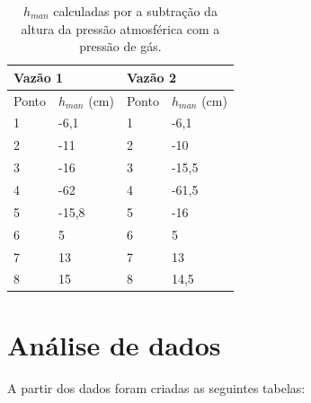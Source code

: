 \documentclass[12pt, a4]{article}
\begin{document}
\begin{table}[H]
    \centering
    \begin{tabular}{|ll|ll|}
    \hline
        \multicolumn{2}{|l|}{Vazão 1}            & \multicolumn{2}{l|}{Vazão 2}            \\ \hline
        \multicolumn{1}{|l|}{Ponto} & $h_{man}$ (cm) & \multicolumn{1}{l|}{Ponto} & $h_{man}$ (cm) \\ \hline
        \multicolumn{1}{|l|}{1}     & -6,1       & \multicolumn{1}{l|}{1}     & -6,1       \\ \hline
        \multicolumn{1}{|l|}{2}     & -11        & \multicolumn{1}{l|}{2}     & -10        \\ \hline
        \multicolumn{1}{|l|}{3}     & -16        & \multicolumn{1}{l|}{3}     & -15,5      \\ \hline
        \multicolumn{1}{|l|}{4}     & -62        & \multicolumn{1}{l|}{4}     & -61,5      \\ \hline
        \multicolumn{1}{|l|}{5}     & -15,8      & \multicolumn{1}{l|}{5}     & -16        \\ \hline
        \multicolumn{1}{|l|}{6}     & 5          & \multicolumn{1}{l|}{6}     & 5          \\ \hline
        \multicolumn{1}{|l|}{7}     & 13         & \multicolumn{1}{l|}{7}     & 13         \\ \hline
        \multicolumn{1}{|l|}{8}     & 15         & \multicolumn{1}{l|}{8}     & 14,5       \\ \hline
    \end{tabular}
    \caption{$h_{man}$ calculadas por a subtração da altura da pressão atmosférica com a pressão de gás.}
\end{table}


\section{Análise de dados}
A partir dos dados foram criadas as seguintes tabelas:
\end{document}
